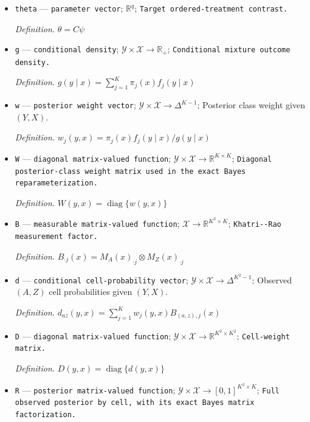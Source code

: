 \documentclass{article}
\begin{document}
\begin{itemize}
  \item \texttt{theta} --- \texttt{parameter vector}; \(\mathbb R^{q}\); \texttt{Target ordered-\allowbreak{}treatment contrast.}
  \par\smallskip\noindent\emph{Definition.} \(\theta=C\psi\)
  \item \texttt{g} --- \texttt{conditional density}; \(\mathcal Y\times\mathcal X\to\mathbb R_{+}\); \texttt{Conditional mixture outcome density.}
  \par\smallskip\noindent\emph{Definition.} \(g(y\mid x)=\sum_{j=1}^{K}\pi_j(x)f_j(y\mid x)\)
  \item \texttt{w} --- \texttt{posterior weight vector}; \(\mathcal Y\times\mathcal X\to\Delta^{K-1}\); Posterior class weight given \((Y,X)\).
  \par\smallskip\noindent\emph{Definition.} \(w_j(y,x)=\pi_j(x)f_j(y\mid x)/g(y\mid x)\)
  \item \texttt{W} --- \texttt{diagonal matrix-\allowbreak{}valued function}; \(\mathcal Y\times\mathcal X\to\mathbb R^{K\times K}\); \texttt{Diagonal posterior-\allowbreak{}class weight matrix used in the exact Bayes reparameterization.}
  \par\smallskip\noindent\emph{Definition.} \(W(y,x)=\operatorname{diag}\{w(y,x)\}\)
  \item \texttt{B} --- \texttt{measurable matrix-\allowbreak{}valued function}; \(\mathcal X\to\mathbb R^{K^{2}\times K}\); \texttt{Khatri-\allowbreak{}-\allowbreak{}Rao measurement factor.}
  \par\smallskip\noindent\emph{Definition.} \(B_{\cdot j}(x)=M_A(x)_{\cdot j}\otimes M_Z(x)_{\cdot j}\)
  \item \texttt{d} --- \texttt{conditional cell-\allowbreak{}probability vector}; \(\mathcal Y\times\mathcal X\to\Delta^{K^{2}-1}\); Observed \((A,Z)\) cell probabilities given \((Y,X)\).
  \par\smallskip\noindent\emph{Definition.} \(d_{az}(y,x)=\sum_{j=1}^{K}w_j(y,x)B_{(a,z),j}(x)\)
  \item \texttt{D} --- \texttt{diagonal matrix-\allowbreak{}valued function}; \(\mathcal Y\times\mathcal X\to\mathbb R^{K^{2}\times K^{2}}\); \texttt{Cell-\allowbreak{}weight matrix.}
  \par\smallskip\noindent\emph{Definition.} \(D(y,x)=\operatorname{diag}\{d(y,x)\}\)
  \item \texttt{R} --- \texttt{posterior matrix-\allowbreak{}valued function}; \(\mathcal Y\times\mathcal X\to[0,1]^{K^{2}\times K}\); \texttt{Full observed posterior by cell,\allowbreak{} with its exact Bayes matrix factorization.}

\end{itemize}
\end{document}

